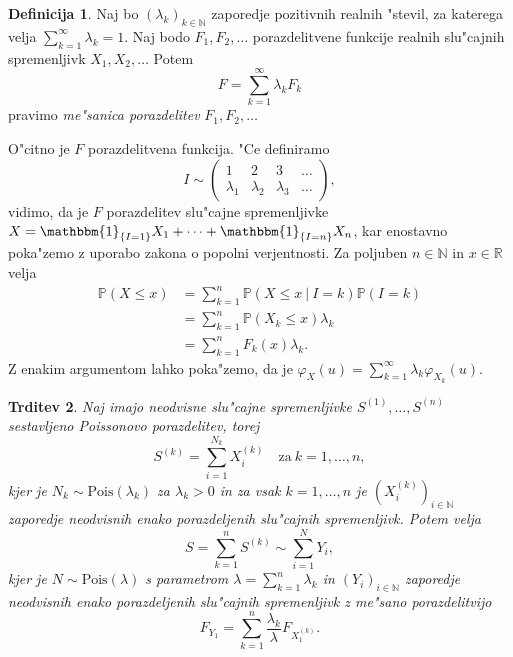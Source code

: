 \documentclass[12pt, a4paper, reqno]{amsart}
\theoremstyle{definition}
\newtheorem{definicija}{Definicija}[section]
\theoremstyle{plain}
\newtheorem{trditev}[definicija]{Trditev}
\newcommand{\R}{\mathbb{R}}
\newcommand{\N}{\mathbb{N}}
\newcommand{\Prob}{\mathbb{P}}
\newcommand{\1}{\mathds{1}}
\newcommand{\Pois}[1]{\text{Pois}(#1)}
\begin{document}
    \begin{definicija}
        Naj bo $(\lambda_k)_{k\in\N}$ zaporedje pozitivnih realnih "stevil, za katerega velja 
        $\sum_{k=1}^\infty\lambda_k = 1$. Naj bodo $F_1, F_2, \dots$ porazdelitvene funkcije
        realnih slu"cajnih spremenljivk $X_1, X_2, \dots$ Potem 
        \begin{equation*}
            F = \sum_{k=1}^\infty\lambda_kF_k
        \end{equation*}
        pravimo \textit{me"sanica porazdelitev} $F_1, F_2, \dots$
    \end{definicija}
    \noindent
    O"citno je $F$ porazdelitvena funkcija. "Ce definiramo 
    $$
    I \sim 
    \begin{pmatrix}
        1 & 2 & 3 & \dots \\
        \lambda_1 & \lambda_2 & \lambda_3 & \dots
    \end{pmatrix},
    $$
    vidimo, da je $F$ porazdelitev slu"cajne spremenljivke $X = \mathbbm{1}_{\{I = 1\}}X_1 + \cdots + \mathbbm{1}_{\{I = n\}}X_n$, 
    kar enostavno poka"zemo z uporabo zakona o popolni verjentnosti. Za poljuben $n\in\N$ in $x\in\R$ velja 
    \begin{align*}
        \Prob\left(X \leq x\right) 
        &= \sum_{k=1}^n\Prob\left(X \leq x \ \big| \ I = k\right)\Prob\left(I = k\right) \\
        &= \sum_{k=1}^n\Prob\left(X_k \leq x\right)\lambda_k \\
        &= \sum_{k=1}^nF_k(x)\lambda_k.
    \end{align*}
    Z enakim argumentom lahko poka"zemo, da je $\varphi_X(u) = \sum_{k=1}^\infty\lambda_k\varphi_{X_k}(u)$.


    \begin{trditev}
        Naj imajo neodvisne slu"cajne spremenljivke $S^{(1)}, \dots, S^{(n)}$ sestavljeno Poissonovo porazdelitev, torej 
        \begin{equation*}
            S^{(k)} = \sum_{i=1}^{N_k}X_i^{(k)} \quad \text{za} \ k=1, \dots, n,
        \end{equation*}
        kjer je $N_k\sim \Pois{\lambda_k}$ za $\lambda_k > 0$ in za vsak $k = 1, \dots, n$ je $(X_i^{(k)})_{i\in\N}$ 
        zaporedje neodvisnih enako porazdeljenih slu"cajnih spremenljivk. Potem velja   
        \begin{equation*}
            S = \sum_{k=1}^nS^{(k)} \sim \sum_{i=1}^{N}Y_i,
        \end{equation*}
        kjer je $N\sim\Pois{\lambda}$ s parametrom $\lambda = \sum_{k=1}^n\lambda_k$ in $(Y_i)_{i\in\N}$ zaporedje
        neodvisnih enako porazdeljenih slu"cajnih spremenljivk z me"sano porazdelitvijo
        \begin{equation*}
        F_{Y_1} = \sum_{k=1}^n\frac{\lambda_k}{\lambda}F_{X_1^{(k)}}.
        \end{equation*}
        \label{trd:vsotaCPDjeCPD}
    \end{trditev}
\end{document}
